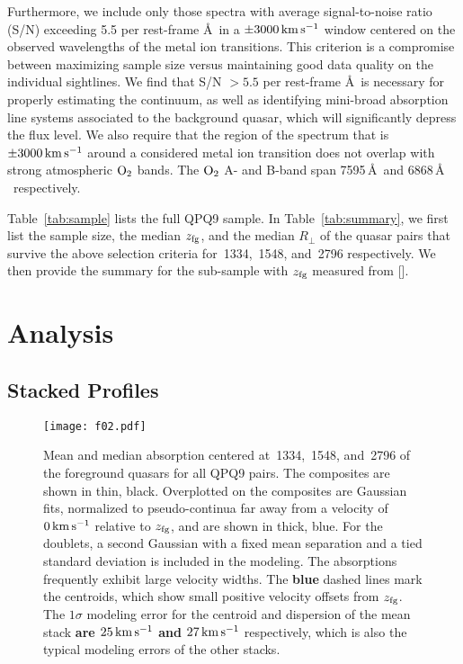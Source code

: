 \documentclass[iop]{emulateapj}
\begin{document}
Furthermore, we include only those spectra with average signal-to-noise ratio (S/N) exceeding 5.5 
per rest-frame \AA \ in a $\pm3000\,{\rm km\,s^{-1}}$ window centered on the observed wavelengths 
of the metal ion transitions. This criterion is a compromise between maximizing sample size versus 
maintaining good data quality on the individual sightlines. We find that S/N $>5.5$ per rest-frame 
\AA \ is necessary for properly estimating the continuum, as well as identifying mini-broad 
absorption line systems associated to the background quasar, which will significantly depress the 
flux level. We also require that the region of the spectrum that is $\pm3000\,{\rm km\,s^{-1}}$ 
around a considered metal ion transition does not overlap with strong atmospheric ${\rm O}_2$ 
bands. The ${\rm O}_2$ A- and B-band span 7595\,\AA \ and 6868\,\AA 
\ respectively. 

Table~\ref{tab:sample} lists the full QPQ9 sample. In Table~\ref{tab:summary}, we first list the 
sample size, the median $z_{\rm fg}$, and the median $R_\perp$ of the quasar pairs that survive 
the above selection criteria for \,1334, \,1548, and \,2796 
respectively. We then provide the summary for the sub-sample with $z_{\rm fg}$ measured from 
[]. 

\section{Analysis}
\label{sec:analysis}

\subsection{Stacked Profiles}
\label{sec:stacks}

\begin{figure}
\texttt{[image: f02.pdf]}
\caption{Mean and median absorption centered at \,1334, \,1548, and 
\,2796 of the foreground quasars for all QPQ9 pairs. The composites are shown in thin, 
black. Overplotted on the composites are Gaussian fits, normalized to pseudo-continua far away 
from a velocity of $0\,{\rm km\,s^{-1}}$ relative to $z_{\rm fg}$, and are shown in thick, blue. 
For the doublets, a second Gaussian with a fixed mean separation and a tied standard deviation is 
included in the modeling. The absorptions frequently exhibit large velocity widths. The {\bf blue} dashed
lines mark the centroids, which show small positive velocity offsets from $z_{\rm fg}$. The 
$1\sigma$ modeling error for the centroid and dispersion of the  mean stack {\bf are
$25\,{\rm km\,s^{-1}}$ and $27\,{\rm km\,s^{-1}}$} respectively, which is also the typical modeling
errors of the other stacks.
}
\label{fig:stacks_and_fits}
\end{figure}
\end{document}
